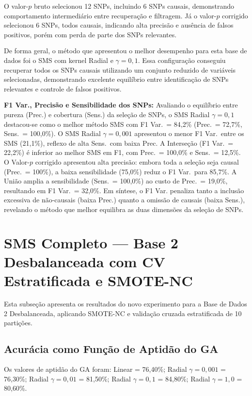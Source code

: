 \documentclass[
    12pt,
    a4paper,
    oneside,
    english,
    french,
    spanish,
    brazil
    ]{abntex2}
\newcommand{\novo}[1]{\textcolor{corNova}{#1}}
\begin{document}
O valor-$p$ bruto selecionou 12 SNPs, incluindo 6 SNPs causais, demonstrando comportamento intermediário entre recuperação e filtragem. Já o valor-$p$ corrigido selecionou 6 SNPs, todos causais, indicando alta precisão e ausência de falsos positivos, porém com perda de parte dos SNPs relevantes.

De forma geral, o método que apresentou o melhor desempenho para esta base de dados foi o SMS com kernel Radial e $\gamma = 0{,}1$. Essa configuração conseguiu recuperar todos os SNPs causais utilizando um conjunto reduzido de variáveis selecionadas, demonstrando excelente equilíbrio entre identificação de SNPs relevantes e controle de falsos positivos.


\novo{\textbf{F1 Var., Precisão e Sensibilidade dos SNPs:} Avaliando o equilíbrio entre pureza (Prec.) e cobertura (Sens.) da seleção de SNPs, o SMS Radial $\gamma=0{,}1$ destacou-se como o melhor método SMS com F1 Var.\ = 84,2\% (Prec.\ = 72,7\%, Sens.\ = 100,0\%). O SMS Radial $\gamma=0{,}001$ apresentou o menor F1 Var.\ entre os SMS (21,1\%), reflexo de alta Sens.\ com baixa Prec. A Interseção (F1 Var.\ = 22,2\%) é inferior ao melhor SMS em F1, com Prec.\ = 100,0\% e Sens.\ = 12,5\%. O Valor-$p$ corrigido apresentou alta precisão: embora toda a seleção seja causal (Prec.\ = 100\%), a baixa sensibilidade (75,0\%) reduz o F1 Var.\ para 85,7\%. A União amplia a sensibilidade (Sens.\ = 100,0\%) ao custo de Prec.\ = 19,0\%, resultando em F1 Var.\ = 32,0\%. Em síntese, o F1 Var. penaliza tanto a inclusão excessiva de não-causais (baixa Prec.) quanto a omissão de causais (baixa Sens.), revelando o método que melhor equilibra as duas dimensões da seleção de SNPs.}
\section{SMS Completo --- Base 2 Desbalanceada com CV Estratificada e SMOTE-NC}

\novo{Esta subseção apresenta os resultados do novo experimento para a Base de Dados 2 Desbalanceada, aplicando SMOTE-NC e validação cruzada estratificada de 10 partições.}

\subsection{Acurácia como Função de Aptidão do GA}

\novo{Os valores de aptidão do GA foram: Linear = 76,40\%; Radial $\gamma{=}0{,}001$ = 76,30\%; Radial $\gamma{=}0{,}01$ = 81,50\%; Radial $\gamma{=}0{,}1$ = 84,80\%; Radial $\gamma{=}1{,}0$ = 80,60\%.}
\end{document}
